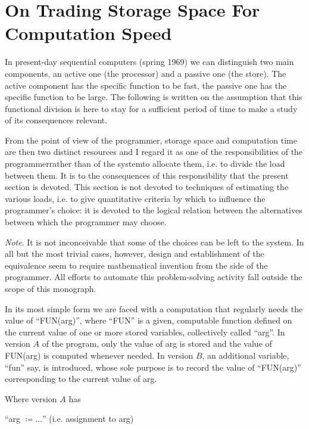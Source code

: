 \section[On trading storage space for computation speed]{On Trading Storage Space For Computation Speed}
\label{sec:trading-storage-for-computation-speed}

In present-day sequential computers (spring 1969) we can distinguish two main components, an active one (the processor) and a passive one (the store). The active component has the specific function to be fast, the passive one has the specific function to be large. The following is written on the assumption that this functional division is here to stay for a sufficient period of time to make a study of its consequences relevant.

From the point of view of the programmer, storage space and computation time are then two distinct resources and I regard it as one of the responsibilities of the programmer\textemdash{}rather than of the system\textemdash{}to allocate them, i.e. to divide the load between them. It is to the consequences of this responsibility that the present section is devoted. This section is not devoted to techniques of estimating the various loads, i.e. to give quantitative criteria by which to influence the programmer's choice: it is devoted to the logical relation between the alternatives between which the programmer may choose.

\noindent
\textit{Note}. It is not inconceivable that some of the choices can be left to the system. In all but the most trivial cases, however, design and establishment of the equivalence seem to require mathematical invention from the side of the programmer. All efforts to automate this problem-solving activity fall outside the scope of this monograph.

In its most simple form we are faced with a computation that regularly needs the value of ``FUN(arg)'', where ``FUN'' is a given, computable function defined on the current value of one or more stored variables, collectively called ``arg''. In version $A$ of the program, only the value of arg is stored and the value of FUN(arg) is computed whenever needed. In version $B$, an additional variable, ``fun'' say, is introduced, whose sole purpose is to record the value of ``FUN(arg)'' corresponding to the current value of arg.

Where version $A$ has
\medskip

{
	\setlength{\parindent}{8em}
	\hspace{-.4em}``arg $\coloneq \dots$'' (i.e. assignment to arg)
	
}
\medskip

